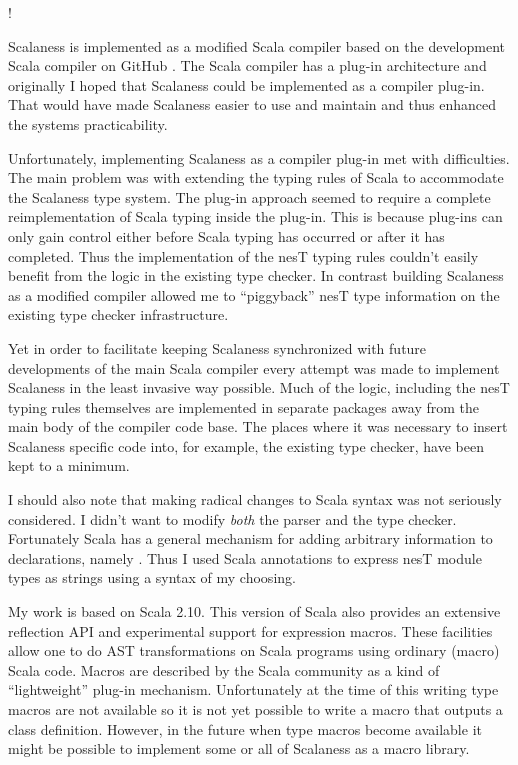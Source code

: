 \lstset{language=scalaness}
\lstMakeShortInline!

Scalaness is implemented as a modified Scala compiler based on the development Scala compiler on
GitHub \cite{XXX}. The Scala compiler has a plug-in architecture and originally I hoped that
Scalaness could be implemented as a compiler plug-in. That would have made Scalaness easier to
use and maintain and thus enhanced the systems practicability.

Unfortunately, implementing Scalaness as a compiler plug-in met with difficulties. The main
problem was with extending the typing rules of Scala to accommodate the Scalaness type system.
The plug-in approach seemed to require a complete reimplementation of Scala typing inside the
plug-in. This is because plug-ins can only gain control either before Scala typing has occurred
or after it has completed. Thus the implementation of the nesT typing rules couldn't easily
benefit from the logic in the existing type checker. In contrast building Scalaness as a
modified compiler allowed me to ``piggyback'' nesT type information on the existing type checker
infrastructure.

Yet in order to facilitate keeping Scalaness synchronized with future developments of the main
Scala compiler every attempt was made to implement Scalaness in the least invasive way possible.
Much of the logic, including the nesT typing rules themselves are implemented in separate
packages away from the main body of the compiler code base. The places where it was necessary to
insert Scalaness specific code into, for example, the existing type checker, have been kept to a
minimum.

I should also note that making radical changes to Scala syntax was not seriously considered. I
didn't want to modify \emph{both} the parser and the type checker. Fortunately Scala has a
general mechanism for adding arbitrary information to declarations, namely
. Thus I used Scala annotations to express nesT module types as strings
using a syntax of my choosing.

My work is based on Scala 2.10. This version of Scala also provides an extensive reflection API
and experimental support for expression macros. These facilities allow one to do AST
transformations on Scala programs using ordinary (macro) Scala code. Macros are described by the
Scala community as a kind of ``lightweight'' plug-in mechanism. Unfortunately at the time of this
writing type macros are not available so it is not yet possible to write a macro that outputs a
class definition. However, in the future when type macros become available it might be possible
to implement some or all of Scalaness as a macro library.

